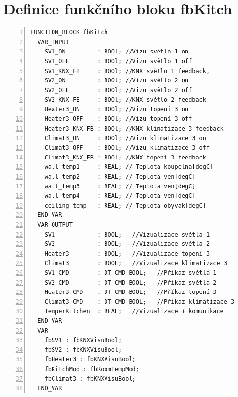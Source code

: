 \chapter{Definice funkčního bloku fbKitch}
\label{apend:fbKitch}
\begin{lstlisting}[language=ST, breaklines=true, numbers=left, numberstyle=\small, numbersep=10pt, frame=single, basicstyle=\ttfamily\small, caption={Definice funkčního bloku fbKitch}, label={lst:fbKitch}]
  FUNCTION_BLOCK fbKitch
  VAR_INPUT
    SV1_ON         : BOOl; //Vizu světlo 1 on
    SV1_OFF        : BOOl; //Vizu světlo 1 off
    SV1_KNX_FB     : BOOl; //KNX světlo 1 feedback,
    SV2_ON         : BOOl; //Vizu světlo 2 on
    SV2_OFF        : BOOl; //Vizu světlo 2 off
    SV2_KNX_FB     : BOOl; //KNX světlo 2 feedback
    Heater3_ON     : BOOl; //Vizu topení 3 on
    Heater3_OFF    : BOOl; //Vizu topení 3 off
    Heater3_KNX_FB : BOOl; //KNX klimatizace 3 feedback
    Climat3_ON     : BOOl; //Vizu klimatizace 3 on
    Climat3_OFF    : BOOl; //Vizu klimatizace 3 off
    Climat3_KNX_FB : BOOl; //KNX topení 3 feedback
    wall_temp1     : REAL; // Teplota koupelna[degC]
    wall_temp2     : REAL; // Teplota ven[degC]
    wall_temp3     : REAL; // Teplota ven[degC]
    wall_temp4     : REAL; // Teplota ven[degC]
    ceiling_temp   : REAL; // Teplota obyvak[degC]
  END_VAR
  VAR_OUTPUT
    SV1            : BOOL;   //Vizualizace světla 1
    SV2            : BOOL;   //Vizualizace světla 2
    Heater3        : BOOL;   //Vizualizace topení 3
    Climat3        : BOOL;   //Vizualizace klimatizace 3
    SV1_CMD        : DT_CMD_BOOL;   //Příkaz světla 1
    SV2_CMD        : DT_CMD_BOOL;   //Příkaz světla 2
    Heater3_CMD    : DT_CMD_BOOL;   //Příkaz topení 3
    Climat3_CMD    : DT_CMD_BOOL;   //Příkaz klimatizace 3
    TemperKitchen  : REAL;   //Vizualizace + komunikace
  END_VAR
  VAR
    fbSV1 : fbKNXVisuBool;
    fbSV2 : fbKNXVisuBool;
    fbHeater3 : fbKNXVisuBool;
    fbKitchMod : fbRoomTempMod;
    fbClimat3 : fbKNXVisuBool;
  END_VAR
\end{lstlisting}
